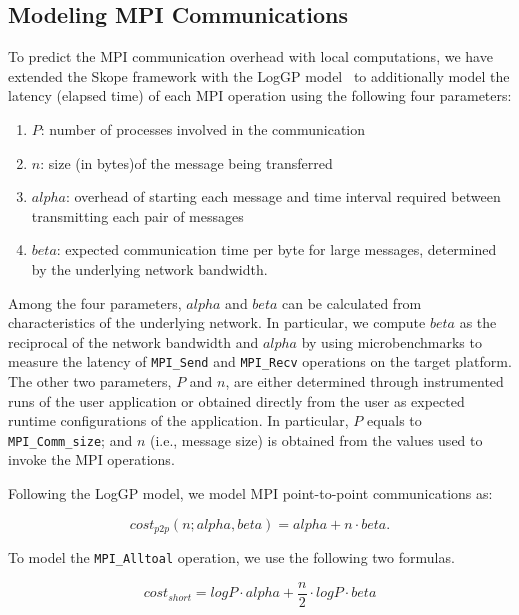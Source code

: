 \subsection{Modeling MPI Communications}

To predict the MPI communication overhead with local
computations, we have extended the Skope framework with the LogGP
model~\cite{loggp} to additionally model the latency (elapsed time) of
each MPI operation using the following four parameters:

\begin{enumerate}

\item $P$: number of processes involved in the communication

\item $n$: size (in bytes)of the message being transferred

\item $alpha$: overhead of starting each message and time interval
  required between transmitting each pair of messages

\item $beta$: expected communication time per byte for large messages,
  determined by the underlying network bandwidth.

\end{enumerate}

Among the four parameters, $alpha$ and $beta$ can be calculated from
characteristics of the underlying network.  In particular, we compute
$beta$ as the reciprocal of the network bandwidth and $alpha$ by using
microbenchmarks to measure the latency of \texttt{MPI\_Send} and
\texttt{MPI\_Recv} operations on the target platform.  The other two
parameters, $P$ and $n$, are either determined through instrumented
runs of the user application or obtained directly from the user as
expected runtime configurations of the application.  In particular,
$P$ equals to \texttt{MPI\_Comm\_size}; and $n$ (i.e., message size)
is obtained from the values used to invoke the MPI operations.

Following the LogGP model, we model MPI point-to-point communications
as:

\begin{equation}
cost_{p2p}(n;alpha,beta) = alpha + n\cdot beta .
\end{equation}

To model the \texttt{MPI\_Alltoal} operation, we use the following two
formulas.

\begin{equation}
  cost_{short} = log P\cdot alpha + \frac{n}{2}\cdot log P\cdot beta
\end{equation}

